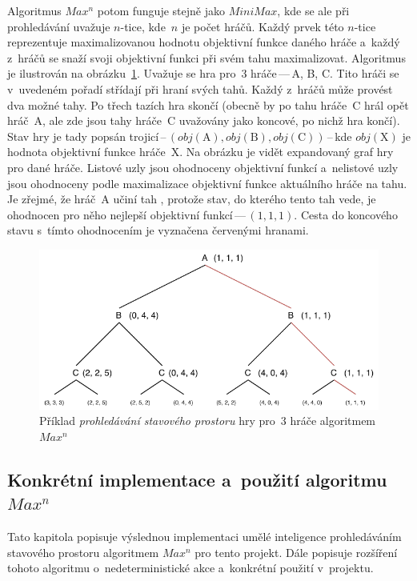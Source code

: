 \documentclass[11pt, a4paper]{article}
\theoremstyle{definition}
\begin{document}
Algoritmus $ Max^n $ potom funguje stejně jako $ MiniMax $, kde se ale
při prohledávání uvažuje $ n $-tice, kde~$ n $ je počet hráčů. Každý prvek
této $ n $-tice reprezentuje maximalizovanou hodnotu objektivní funkce
daného hráče a~každý z~hráčů se snaží svoji objektivní funkci při svém
tahu maximalizovat. Algoritmus je ilustrován na obrázku~\ref{fig:maxn}.
Uvažuje se hra pro~3 hráče\,---\,A, B, C. Tito hráči se v~uvedeném pořadí
střídají při hraní svých tahů. Každý z~hráčů může provést dva možné tahy.
Po třech tazích hra skončí (obecně by po tahu hráče~C hrál opět hráč~A,
ale zde jsou tahy hráče~C uvažovány jako koncové, po nichž hra končí).
Stav hry je tady popsán trojicí\,--\,$ (obj(\text{A}), obj(\text{B}),
obj(\text{C})) $\,--\,kde $ obj(\text{X}) $ je hodnota objektivní funkce
hráče~X. Na obrázku je vidět expandovaný graf hry pro dané hráče. Listové
uzly jsou ohodnoceny objektivní funkcí a~nelistové uzly jsou ohodnoceny
podle maximalizace objektivní funkce aktuálního hráče na tahu. Je zřejmé,
že hráč~A učiní tah , protože stav, do kterého tento tah vede,
je ohodnocen pro něho nejlepší objektivní funkcí\,---\,$ (1, 1, 1) $.
Cesta do koncového stavu s~tímto ohodnocením je vyznačena červenými hranami.

\begin{figure}[hbt]
    \centering
    \includegraphics[width=.8 \linewidth]{maxn.pdf}
    \caption{%
        Příklad \emph{prohledávání stavového prostoru} hry pro~3 hráče
        algoritmem $ Max^n $%
    }
    \label{fig:maxn}
\end{figure}

\subsection{\texorpdfstring{%
    Konkrétní implementace a~použití algoritmu $ Max^n $%
}{Konkrétní implementace a~použití algoritmu MaxN}}

Tato kapitola popisuje výslednou implementaci umělé inteligence
prohledáváním stavového prostoru algoritmem $ Max^n $ pro tento projekt.
Dále popisuje rozšíření tohoto algoritmu o~nedeterministické akce
a~konkrétní použití v~projektu.
\end{document}
